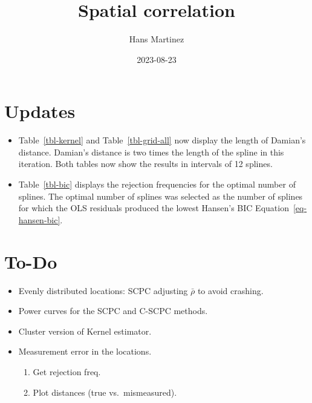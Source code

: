\documentclass[
]{article}
\title{Spatial correlation}
\author{Hans Martinez}
\date{2023-08-23}
\providecommand{\tightlist}{%
  \setlength{\itemsep}{0pt}\setlength{\parskip}{0pt}}\usepackage{longtable,booktabs,array}
\begin{document}
\maketitle
\ifdefined\Shaded\renewenvironment{Shaded}{\begin{tcolorbox}[enhanced, borderline west={3pt}{0pt}{shadecolor}, interior hidden, breakable, sharp corners, frame hidden, boxrule=0pt]}{\end{tcolorbox}}\fi

\hypertarget{updates}{%
\section*{Updates}\label{updates}}

\begin{itemize}
\item
  Table~\ref{tbl-kernel} and Table~\ref{tbl-grid-all} now display the
  length of Damian's distance. Damian's distance is two times the length
  of the spline in this iteration. Both tables now show the results in
  intervals of 12 splines.
\item
  Table~\ref{tbl-bic} displays the rejection frequencies for the optimal
  number of splines. The optimal number of splines was selected as the
  number of splines for which the OLS residuals produced the lowest
  Hansen's BIC Equation~\ref{eq-hansen-bic}.
\end{itemize}

\hypertarget{to-do}{%
\section*{To-Do}\label{to-do}}

\begin{itemize}
\tightlist
\item
  Evenly distributed locations: SCPC adjusting \(\bar\rho\) to avoid
  crashing.
\item
  Power curves for the SCPC and C-SCPC methods.
\item
  Cluster version of Kernel estimator.
\item
  Measurement error in the locations.

  \begin{enumerate}
  \def\labelenumi{\alph{enumi}.}
  \tightlist
  \item
    Get rejection freq.
  \item
    Plot distances (true vs.~mismeasured).
  \end{enumerate}
\end{itemize}
\end{document}
